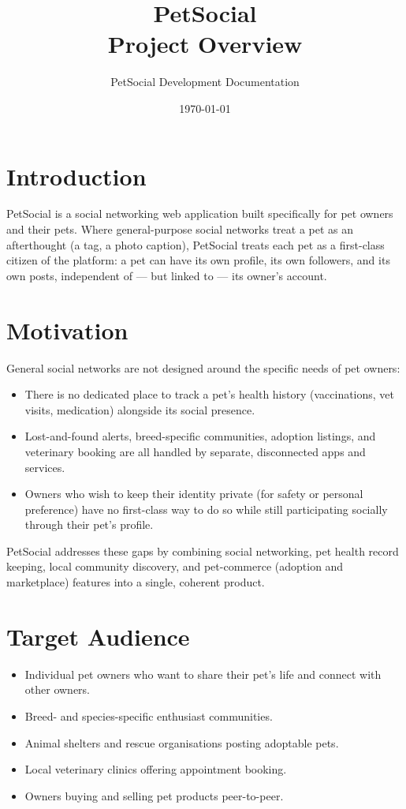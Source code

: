 \documentclass[11pt,a4paper]{article}
\title{PetSocial\\\large Project Overview}
\author{PetSocial Development Documentation}
\date{\today}
\begin{document}
\maketitle
\thispagestyle{fancy}

\tableofcontents

\section{Introduction}
PetSocial is a social networking web application built specifically for pet owners and
their pets. Where general-purpose social networks treat a pet as an afterthought (a tag,
a photo caption), PetSocial treats each pet as a first-class citizen of the platform: a
pet can have its own profile, its own followers, and its own posts, independent of --- but
linked to --- its owner's account.

\section{Motivation}
General social networks are not designed around the specific needs of pet owners:

\begin{itemize}[leftmargin=*]
  \item There is no dedicated place to track a pet's health history (vaccinations, vet
        visits, medication) alongside its social presence.
  \item Lost-and-found alerts, breed-specific communities, adoption listings, and
        veterinary booking are all handled by separate, disconnected apps and services.
  \item Owners who wish to keep their identity private (for safety or personal
        preference) have no first-class way to do so while still participating socially
        through their pet's profile.
\end{itemize}

PetSocial addresses these gaps by combining social networking, pet health record
keeping, local community discovery, and pet-commerce (adoption and marketplace) features
into a single, coherent product.

\section{Target Audience}
\begin{itemize}[leftmargin=*]
  \item Individual pet owners who want to share their pet's life and connect with other
        owners.
  \item Breed- and species-specific enthusiast communities.
  \item Animal shelters and rescue organisations posting adoptable pets.
  \item Local veterinary clinics offering appointment booking.
  \item Owners buying and selling pet products peer-to-peer.
\end{itemize}
\end{document}
